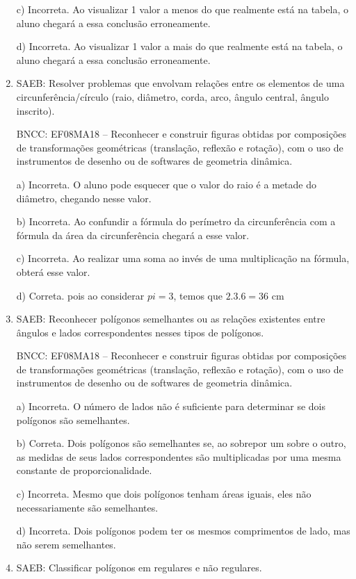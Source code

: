 \begin{enumerate}
c) Incorreta. Ao visualizar 1 valor a menos do que realmente está
na tabela, o aluno chegará a essa conclusão erroneamente.

d) Incorreta. Ao visualizar 1 valor a mais do que realmente está
na tabela, o aluno chegará a essa conclusão erroneamente.

\item SAEB: Resolver problemas que envolvam relações entre os elementos de uma
circunferência/círculo (raio, diâmetro, corda, arco, ângulo central,
ângulo inscrito).

BNCC: EF08MA18 -- Reconhecer e construir figuras obtidas por composições
de transformações geométricas (translação, reflexão e rotação), com o
uso de instrumentos de desenho ou de softwares de geometria dinâmica.

a) Incorreta. O aluno pode esquecer que o valor do raio é a metade
do diâmetro, chegando nesse valor.

b) Incorreta. Ao confundir a fórmula do perímetro da circunferência
com a fórmula da área da circunferência chegará a esse valor.

c) Incorreta. Ao realizar uma soma ao invés de uma multiplicação
na fórmula, obterá esse valor.

d) Correta. pois ao considerar $pi = 3$, temos que $2.3.6 = 36$ cm

\item SAEB: Reconhecer polígonos semelhantes ou as relações existentes entre
ângulos e lados correspondentes nesses tipos de polígonos.

BNCC: EF08MA18 -- Reconhecer e construir figuras obtidas por composições
de transformações geométricas (translação, reflexão e rotação), com o
uso de instrumentos de desenho ou de softwares de geometria dinâmica.

a) Incorreta. O número de lados não é suficiente para determinar se
dois polígonos são semelhantes.

b) Correta. Dois polígonos são semelhantes se, ao sobrepor um sobre
o outro, as medidas de seus lados correspondentes são multiplicadas por
uma mesma constante de proporcionalidade.

c) Incorreta. Mesmo que dois polígonos tenham áreas iguais, eles
não necessariamente são semelhantes.

d) Incorreta. Dois polígonos podem ter os mesmos comprimentos de
lado, mas não serem semelhantes.

\item SAEB: Classificar polígonos em regulares e não regulares.


\end{enumerate}
